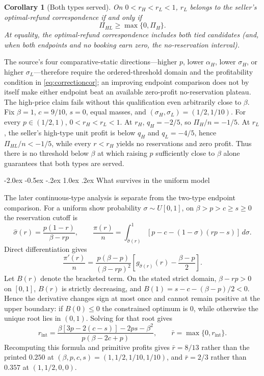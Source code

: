 \documentclass[12pt]{article}
\makeatletter
\newtheorem{corollary}{Corollary}
\renewcommand\section{\@startsection{section}{1}{\z@}%
  {-2.0ex \@plus -0.5ex \@minus -.2ex}%
  {1.0ex \@plus .2ex}%
  {\centering\normalfont\bfseries\fontsize{14}{16}\selectfont}}
\makeatother
\begin{document}
\begin{corollary}[Both types served]
On $0<r_H<r_L<1$, $r_L$ belongs to the seller's optimal-refund correspondence if and only if
\begin{equation}
 \Pi_{HL}\geq \max\{0,\Pi_H\}.
 \label{eq:correctioncor}
\end{equation}
At equality, the optimal-refund correspondence includes both tied candidates (and, when both endpoints and no booking earn zero, the no-reservation interval).
\end{corollary}

The source's four comparative-static directions---higher $p$, lower $\alpha_H$, lower $\sigma_H$, or higher $\sigma_L$---therefore require the ordered-threshold domain and the profitability condition in \eqref{eq:correctioncor}; an improving endpoint comparison does not by itself make either endpoint beat an available zero-profit no-reservation plateau. The high-price claim fails without this qualification even arbitrarily close to $\beta$. Fix $\beta=1$, $c=9/10$, $s=0$, equal masses, and $(\sigma_H,\sigma_L)=(1/2,1/10)$. For every $p\in(1/2,1)$, $0<r_H<r_L<1$. At $r_H$, $q_H=-2/5$, so $\Pi_H/n=-1/5$. At $r_L$, the seller's high-type unit profit is below $q_H$ and $q_L=-4/5$, hence $\Pi_{HL}/n<-1/5$, while every $r<r_H$ yields no reservations and zero profit. Thus there is no threshold below $\beta$ at which raising $p$ sufficiently close to $\beta$ alone guarantees that both types are served.

\section{What survives in the uniform model}

The later continuous-type analysis is separate from the two-type endpoint comparison. For a uniform show probability $\sigma\sim U[0,1]$, on $\beta>p>c\geq s\geq0$ the reservation cutoff is
\[
 \widehat\sigma(r)=\frac{p(1-r)}{\beta-rp},\qquad
 \frac{\pi(r)}n=\int_{\widehat\sigma(r)}^1[p-c-(1-\sigma)(rp-s)]\,d\sigma.
\]
Direct differentiation gives
\[
 \frac{\pi'(r)}n=\frac{p(\beta-p)}{(\beta-rp)^2}
 \left[g_{\widehat\sigma(r)}(r)-\frac{\beta-p}{2}\right].
\]
Let $B(r)$ denote the bracketed term. On the stated strict domain, $\beta-rp>0$ on $[0,1]$, $B(r)$ is strictly decreasing, and $B(1)=s-c-(\beta-p)/2<0$. Hence the derivative changes sign at most once and cannot remain positive at the upper boundary: if $B(0)\leq0$ the constrained optimum is $0$, while otherwise the unique root lies in $(0,1)$. Solving for that root gives
\[
 r_{\mathrm{int}}=\frac{\beta[3p-2(c-s)]-2ps-\beta^2}{p(\beta-2c+p)},\qquad
 \bar r=\max\{0,r_{\mathrm{int}}\}.
\]
Recomputing this formula and primitive profits gives $\bar r=8/13$ rather than the printed $0.250$ at $(\beta,p,c,s)=(1,1/2,1/10,1/10)$, and $\bar r=2/3$ rather than $0.357$ at $(1,1/2,0,0)$.
\end{document}
